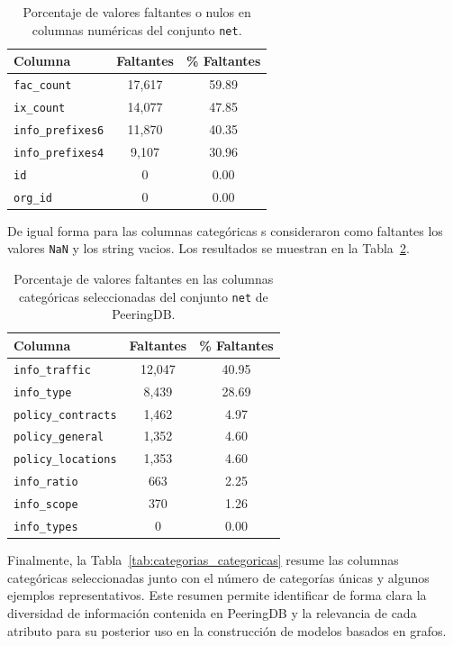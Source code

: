 \begin{table}[H]
\centering
\caption{Porcentaje de valores faltantes o nulos en columnas numéricas del conjunto \texttt{net}.}
\label{tab:faltantes_numericos}
\begin{tabular}{lcc}
\hline
\textbf{Columna} & \textbf{Faltantes} & \textbf{\% Faltantes} \\
\hline
\texttt{fac\_count}       & 17,617 & 59.89 \\
\texttt{ix\_count}        & 14,077 & 47.85 \\
\texttt{info\_prefixes6}  & 11,870 & 40.35 \\
\texttt{info\_prefixes4}  & 9,107  & 30.96 \\
\texttt{id}               & 0      & 0.00 \\
\texttt{org\_id}          & 0      & 0.00 \\
\hline
\end{tabular}
\end{table}

De igual forma para las columnas categóricas s consideraron como faltantes los valores \texttt{NaN} y los string vacios. Los resultados se muestran en la Tabla~\ref{tab:faltantes_categoricas}.

\begin{table}[H]
\centering
\caption{Porcentaje de valores faltantes en las columnas categóricas seleccionadas del conjunto \texttt{net} de PeeringDB.}
\label{tab:faltantes_categoricas}
\renewcommand{\arraystretch}{1.2}
\begin{tabular}{lcc}
\hline
\textbf{Columna} & \textbf{Faltantes} & \textbf{\% Faltantes} \\
\hline
\texttt{info\_traffic}      & 12,047 & 40.95 \\
\texttt{info\_type}         & 8,439  & 28.69 \\
\texttt{policy\_contracts}  & 1,462  & 4.97  \\
\texttt{policy\_general}    & 1,352  & 4.60  \\
\texttt{policy\_locations}  & 1,353  & 4.60  \\
\texttt{info\_ratio}        & 663    & 2.25  \\
\texttt{info\_scope}        & 370    & 1.26  \\
\texttt{info\_types}        & 0      & 0.00  \\
\hline
\end{tabular}
\end{table}


Finalmente, la Tabla~\ref{tab:categorias_categoricas} resume las columnas categóricas seleccionadas junto con el número de categorías únicas y algunos ejemplos representativos.  
Este resumen permite identificar de forma clara la diversidad de información contenida en PeeringDB y la relevancia de cada atributo para su posterior uso en la construcción de modelos basados en grafos.


